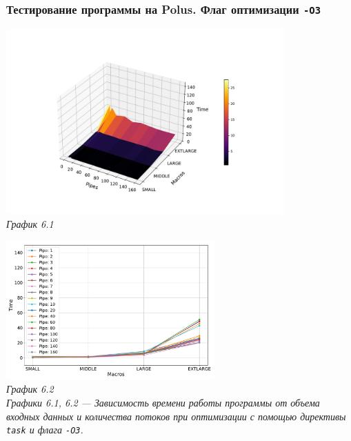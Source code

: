 \documentclass[a4paper, 11pt]{article}
\begin{document}
\subsubsection*{Тестирование программы на Polus. Флаг оптимизации \texttt{-O3}}
\begin{center}
    \includegraphics[width=0.8\textwidth]{../graph/task_o3.pdf} \\
    \small \it
    График 6.1
\end{center}

\begin{center}
    \includegraphics[width=0.6\textwidth]{../graph/task_o31.pdf} \\
    \small \it
    График 6.2\\ Графики 6.1, 6.2 --- Зависимость времени работы программы от объема входных данных и количества потоков при оптимизации с помощью директивы \texttt{task} и флага \texttt{-O3}.
\end{center}
\end{document}

